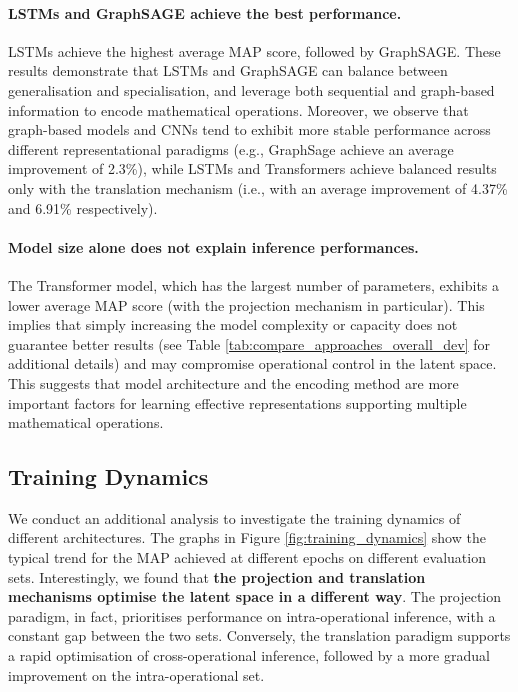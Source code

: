 \documentclass[11pt]{article}
\begin{document}
\paragraph{LSTMs and GraphSAGE achieve the best performance.} LSTMs achieve the highest average MAP score, followed by GraphSAGE. These results demonstrate that LSTMs and GraphSAGE can balance between generalisation and specialisation, and leverage both sequential and graph-based information to encode mathematical operations. Moreover, we observe that graph-based models and CNNs tend to exhibit more stable performance across different representational paradigms (e.g., GraphSage achieve an average improvement of 2.3\%), while LSTMs and Transformers achieve balanced results only with the translation mechanism (i.e., with an average improvement of 4.37\% and 6.91\% respectively).


\paragraph{Model size alone does not explain inference performances.} The Transformer model, which has the largest number of parameters, exhibits a lower average MAP score (with the projection mechanism in particular). This implies that simply increasing the model complexity or capacity does not guarantee better results (see Table \ref{tab:compare_approaches_overall_dev} for additional details) and may compromise operational control in the latent space. This suggests that model architecture and the encoding method are more important factors for learning effective representations supporting multiple mathematical operations.

\subsection{Training Dynamics}

We conduct an additional analysis to investigate the training dynamics of different architectures. The graphs in Figure \ref{fig:training_dynamics} show the typical trend for the MAP achieved at different epochs on different evaluation sets. Interestingly, we found that \textbf{the projection and translation mechanisms optimise the latent space in a different way}. 
The projection paradigm, in fact, prioritises performance on intra-operational inference, with a constant gap between the two sets. Conversely, the translation paradigm supports a rapid optimisation of cross-operational inference, followed by a more gradual improvement on the intra-operational set. 
\end{document}
